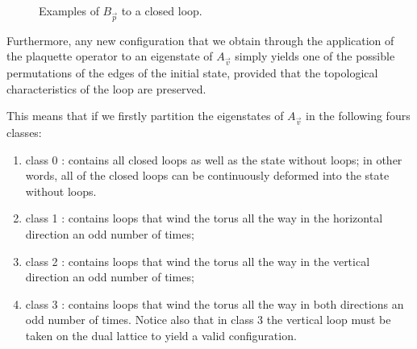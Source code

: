 \documentclass{Configuration_Files/PoliMi3i_thesis}
\begin{document}
\begin{figure}
\begin{center}

	\end{center}

\caption{Examples of $B_{\vec{p}} $ to a closed loop.}
\label{fig:applyBp}
\end{figure}


Furthermore, any new configuration that we obtain through the application of the plaquette operator to an eigenstate of $A_{\vec{v}} $ simply yields one of the possible permutations of the edges of the initial state, provided that the topological characteristics of the loop are preserved.

This means that if we firstly partition the eigenstates of $A_{\vec{v}} $ in the following fours classes: 

\begin{enumerate}
	\item class 0 : contains all closed loops as well as the state without loops; in other words, all of the closed loops can be continuously deformed into the state without loops.
	
	\item class 1 : contains loops that wind the torus all the way in the horizontal direction an odd number of times;
	
	\item class 2 : contains loops that wind the torus all the way in the vertical direction an odd number of times;
	
	\item class 3 : contains loops that wind the torus all the way in both directions an odd number of times. Notice also  that in class 3 the vertical loop must be taken on the dual lattice to yield a valid configuration.
	
\end{enumerate}
\end{document}
